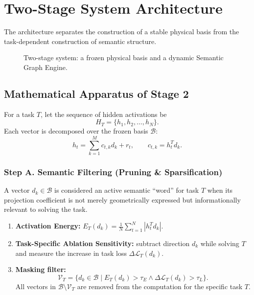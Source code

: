 \documentclass[11pt,a4paper]{article}
\begin{document}
\section{Two-Stage System Architecture}
The architecture separates the construction of a stable physical basis from the task-dependent construction of semantic structure.
\begin{figure}[h!]
\centering
{}
\caption{Two-stage system: a frozen physical basis and a dynamic Semantic Graph Engine.}
\end{figure}

\subsection*{Mathematical Apparatus of Stage 2}
For a task $T$, let the sequence of hidden activations be
\[H_T=\{h_1,h_2,\dots,h_N\}.\]
Each vector is decomposed over the frozen basis $\mathcal B$:
\[h_t=\sum_{k=1}^{M}c_{t,k}d_k+r_t,\qquad c_{t,k}=h_t^Td_k.\]

\subsubsection*{Step A. Semantic Filtering (Pruning \& Sparsification)}
A vector $d_k\in\mathcal B$ is considered an active semantic ``word'' for task $T$ when its projection coefficient is not merely geometrically expressed but informationally relevant to solving the task.
\begin{enumerate}
\item \textbf{Activation Energy:} $E_T(d_k)=\frac1N\sum_{t=1}^N|h_t^Td_k|$.
\item \textbf{Task-Specific Ablation Sensitivity:} subtract direction $d_k$ while solving $T$ and measure the increase in task loss $\Delta\mathcal L_T(d_k)$.
\item \textbf{Masking filter:}
\[\mathcal V_T=\{d_k\in\mathcal B\mid E_T(d_k)>\tau_E\land\Delta\mathcal L_T(d_k)>\tau_L\}.\]
All vectors in $\mathcal B\setminus\mathcal V_T$ are removed from the computation for the specific task $T$.
\end{enumerate}
\end{document}
